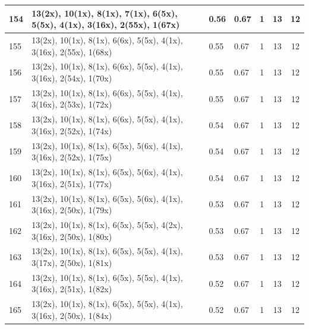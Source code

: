 \begin{small}
\begin{longtable}{|p{0.5cm}|p{9cm}|p{1.3cm}|p{1.3cm}|c|c|c|}
  154 & 13(2x), 10(1x), 8(1x), 7(1x), 6(5x), 5(5x), 4(1x), 3(16x), 2(55x), 1(67x) & \cellcolor{colorOK}  0.56 & \cellcolor{colorOK} 0.67 & 1 & 13 & \cellcolor{colorGood} 12 \\   \hline
  155 & 13(2x), 10(1x), 8(1x), 6(6x), 5(5x), 4(1x), 3(16x), 2(55x), 1(68x) & \cellcolor{colorGood}  0.55 & \cellcolor{colorGood} 0.67 & 1 & 13 & \cellcolor{colorGood} 12 \\   \hline
  156 & 13(2x), 10(1x), 8(1x), 6(6x), 5(5x), 4(1x), 3(16x), 2(54x), 1(70x) & \cellcolor{colorGood}  0.55 & \cellcolor{colorGood} 0.67 & 1 & 13 & \cellcolor{colorGood} 12 \\   \hline
  157 & 13(2x), 10(1x), 8(1x), 6(6x), 5(5x), 4(1x), 3(16x), 2(53x), 1(72x) & \cellcolor{colorGood}  0.55 & \cellcolor{colorGood} 0.67 & 1 & 13 & \cellcolor{colorGood} 12 \\   \hline
  158 & 13(2x), 10(1x), 8(1x), 6(6x), 5(5x), 4(1x), 3(16x), 2(52x), 1(74x) & \cellcolor{colorGood}  0.54 & \cellcolor{colorGood} 0.67 & 1 & 13 & \cellcolor{colorGood} 12 \\   \hline
  159 & 13(2x), 10(1x), 8(1x), 6(5x), 5(6x), 4(1x), 3(16x), 2(52x), 1(75x) & \cellcolor{colorGood}  0.54 & \cellcolor{colorGood} 0.67 & 1 & 13 & \cellcolor{colorGood} 12 \\   \hline
  160 & 13(2x), 10(1x), 8(1x), 6(5x), 5(6x), 4(1x), 3(16x), 2(51x), 1(77x) & \cellcolor{colorGood}  0.54 & \cellcolor{colorGood} 0.67 & 1 & 13 & \cellcolor{colorGood} 12 \\   \hline
  161 & 13(2x), 10(1x), 8(1x), 6(5x), 5(6x), 4(1x), 3(16x), 2(50x), 1(79x) & \cellcolor{colorGood}  0.53 & \cellcolor{colorGood} 0.67 & 1 & 13 & \cellcolor{colorGood} 12 \\   \hline
  162 & 13(2x), 10(1x), 8(1x), 6(5x), 5(5x), 4(2x), 3(16x), 2(50x), 1(80x) & \cellcolor{colorGood}  0.53 & \cellcolor{colorGood} 0.67 & 1 & 13 & \cellcolor{colorGood} 12 \\   \hline
  163 & 13(2x), 10(1x), 8(1x), 6(5x), 5(5x), 4(1x), 3(17x), 2(50x), 1(81x) & \cellcolor{colorGood}  0.53 & \cellcolor{colorGood} 0.67 & 1 & 13 & \cellcolor{colorGood} 12 \\   \hline
  164 & 13(2x), 10(1x), 8(1x), 6(5x), 5(5x), 4(1x), 3(16x), 2(51x), 1(82x) & \cellcolor{colorGood}  0.52 & \cellcolor{colorGood} 0.67 & 1 & 13 & \cellcolor{colorGood} 12 \\   \hline
  165 & 13(2x), 10(1x), 8(1x), 6(5x), 5(5x), 4(1x), 3(16x), 2(50x), 1(84x) & \cellcolor{colorGood}  0.52 & \cellcolor{colorGood} 0.67 & 1 & 13 & \cellcolor{colorGood} 12 \\   \hline

\end{longtable}
\end{small}
